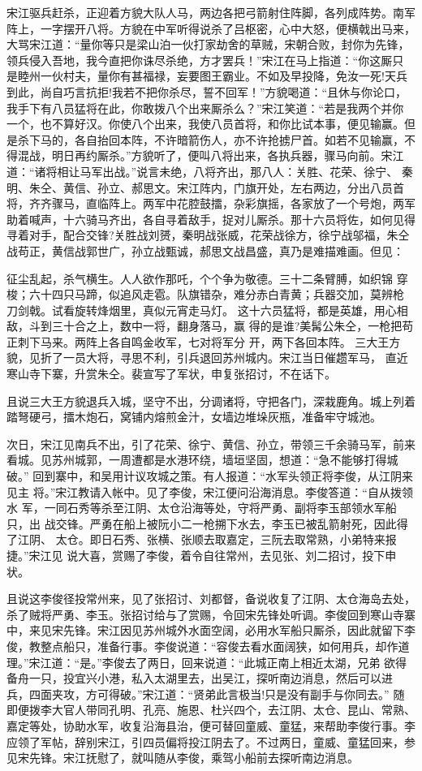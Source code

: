 宋江驱兵赶杀，正迎着方貌大队人马，两边各把弓箭射住阵脚，各列成阵势。南军
阵上，一字摆开八将。方貌在中军听得说杀了吕枢密，心中大怒，便横戟出马来，
大骂宋江道：“量你等只是梁山泊一伙打家劫舍的草贼，宋朝合败，封你为先锋，
领兵侵入吾地，我今直把你诛尽杀绝，方才罢兵！”宋江在马上指道：“你这厮只
是睦州一伙村夫，量你有甚福禄，妄要图王霸业。不如及早投降，免汝一死!天兵
到此，尚自巧言抗拒!我若不把你杀尽，誓不回军！”方貌喝道：“且休与你论口，
我手下有八员猛将在此，你敢拨八个出来厮杀么？”宋江笑道：“若是我两个并你
一个，也不算好汉。你使八个出来，我使八员首将，和你比试本事，便见输赢。但
是杀下马的，各自抬回本阵，不许暗箭伤人，亦不许抢掳尸首。如若不见输赢，不
得混战，明日再约厮杀。”方貌听了，便叫八将出来，各执兵器，骤马向前。宋江
道：“诸将相让马军出战。”说言未绝，八将齐出，那八人：关胜、花荣、徐宁、
秦明、朱仝、黄信、孙立、郝思文。宋江阵内，门旗开处，左右两边，分出八员首
将，齐齐骤马，直临阵上。两军中花腔鼓擂，杂彩旗摇，各家放了一个号炮，两军
助着喊声，十六骑马齐出，各自寻着敌手，捉对儿厮杀。那十六员将佐，如何见得
寻着对手，配合交锋?关胜战刘赟，秦明战张威，花荣战徐方，徐宁战邬福，朱仝
战苟正，黄信战郭世广，孙立战甄诚，郝思文战昌盛，真乃是难描难画。但见：

征尘乱起，杀气横生。人人欲作那吒，个个争为敬德。三十二条臂膊，如织锦
穿梭；六十四只马蹄，似追风走雹。队旗错杂，难分赤白青黄；兵器交加，莫辨枪
刀剑戟。试看旋转烽烟里，真似元宵走马灯。
这十六员猛将，都是英雄，用心相敌，斗到三十合之上，数中一将，翻身落马，赢
得的是谁?美髯公朱仝，一枪把苟正刺下马来。两阵上各自鸣金收军，七对将军分
开，两下各回本阵。
三大王方貌，见折了一员大将，寻思不利，引兵退回苏州城内。宋江当日催趱军马，
直近寒山寺下寨，升赏朱仝。裴宣写了军状，申复张招讨，不在话下。

且说三大王方貌退兵入城，坚守不出，分调诸将，守把各门，深栽鹿角。城上列着
踏弩硬弓，擂木炮石，窝铺内熔煎金汁，女墙边堆垛灰瓶，准备牢守城池。

次日，宋江见南兵不出，引了花荣、徐宁、黄信、孙立，带领三千余骑马军，前来
看城。见苏州城郭，一周遭都是水港环绕，墙垣坚固，想道：“急不能够打得城破。”
回到寨中，和吴用计议攻城之策。有人报道：“水军头领正将李俊，从江阴来见主
将。”宋江教请入帐中。见了李俊，宋江便问沿海消息。李俊答道：“自从拨领水
军，一同石秀等杀至江阴、太仓沿海等处，守将严勇、副将李玉部领水军船只，出
战交锋。严勇在船上被阮小二一枪搠下水去，李玉已被乱箭射死，因此得了江阴、
太仓。即日石秀、张横、张顺去取嘉定，三阮去取常熟，小弟特来报捷。”宋江见
说大喜，赏赐了李俊，着令自往常州，去见张、刘二招讨，投下申状。

且说这李俊径投常州来，见了张招讨、刘都督，备说收复了江阴、太仓海岛去处，
杀了贼将严勇、李玉。张招讨给与了赏赐，令回宋先锋处听调。李俊回到寒山寺寨
中，来见宋先锋。宋江因见苏州城外水面空阔，必用水军船只厮杀，因此就留下李
俊，教整点船只，准备行事。李俊说道：“容俊去看水面阔狭，如何用兵，却作道
理。”宋江道：“是。”李俊去了两日，回来说道：“此城正南上相近太湖，兄弟
欲得备舟一只，投宜兴小港，私入太湖里去，出吴江，探听南边消息，然后可以进
兵，四面夹攻，方可得破。”宋江道：“贤弟此言极当!只是没有副手与你同去。”
随即便拨李大官人带同孔明、孔亮、施恩、杜兴四个，去江阴、太仓、昆山、常熟、
嘉定等处，协助水军，收复沿海县治，便可替回童威、童猛，来帮助李俊行事。李
应领了军帖，辞别宋江，引四员偏将投江阴去了。不过两日，童威、童猛回来，参
见宋先锋。宋江抚慰了，就叫随从李俊，乘驾小船前去探听南边消息。

